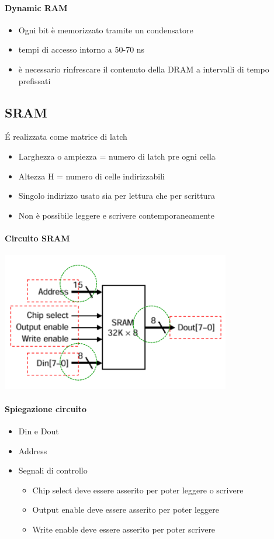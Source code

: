\documentclass[12pt, a4paper, openany]{book}
\begin{document}
\paragraph*{Dynamic RAM} \begin{itemize}
    \item Ogni bit è memorizzato tramite un condensatore
    \item tempi di accesso intorno a 50-70 ns
    \item è necessario rinfrescare il contenuto della DRAM a intervalli di tempo prefissati
\end{itemize}

\subsection*{SRAM}
\'E realizzata come matrice di latch
\begin{itemize}
    \item Larghezza o ampiezza = numero di latch pre ogni cella
    \item Altezza H = numero di celle indirizzabili
    \item Singolo indirizzo usato sia per lettura che per scrittura
    \item Non è possibile leggere e scrivere contemporaneamente
\end{itemize}

\paragraph*{Circuito SRAM}
\begin{center}
    \includegraphics[width=100mm, scale=0.5]{SRAM.png}
\end{center}
\paragraph*{Spiegazione circuito}\begin{itemize}
    \item Din e Dout
    \item Address
    \item Segnali di controllo \begin{itemize}
        \item Chip select deve essere asserito per poter leggere o scrivere
        \item Output enable deve essere asserito per poter leggere
        \item Write enable deve essere asserito per poter scrivere
    \end{itemize}
\end{itemize}
\end{document}
